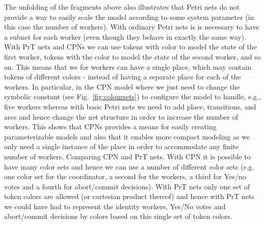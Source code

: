 The unfolding of the fragments above also illustrates that Petri nets
do not provide a way to easily scale the model according to some
system parameter (in this case the number of workers). With ordinary
Petri nets is is necessary to have a subnet for each worker (even
though they behave in exactly the same way). With PrT nets and CPNs we
can use tokens with color  to model the state of the
first worker, tokens with the color  to model the
state of the second worker, and so on. This means that we for
 workers can have a single  place, which may
contain tokens of  different colors - instead of having a
separate  place for each of the  workers. In
particular, in the CPN model where we just need to change the symbolic
constant  (see Fig.~\ref{fig:coloursets}) to configure the
model to handle, e.g., five workers whereas with basic Petri nets we
need to add place, transitions, and arcs and hence change the net
structure in order to increase the number of workers.  This shows that
CPNs provides a means for easily creating parameterizable models and
also that it enables more compact modeling as we only need a single
instance of the  place in order to accommodate any
finite number of workers. Comparing CPN and PrT nets. With CPN it is
possible to have many color sets and hence we can use a number of
different color sets (e.g. one color set for the coordinator, a second
for the workers, a third for Yes/no votes and a fourth for
abort/commit decisions). With PrT nets only one set of token colors
are allowed (or cartesian product thereof) and hence with PrT nets we
could have had to represent the identity workers, Yes/No votes and
abort/commit decisions by colors based on this single set of token
colors.
